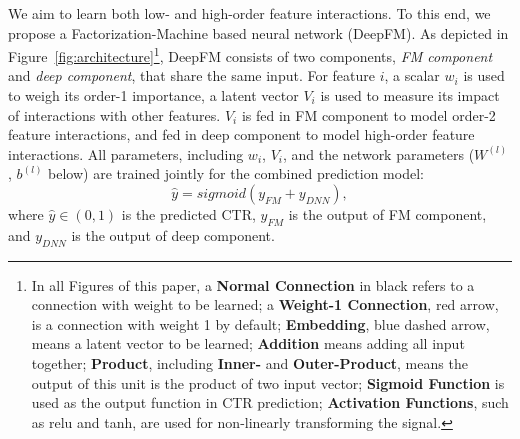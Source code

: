 We aim to learn both low- and high-order feature interactions. To this end, we propose a Factorization-Machine based neural network (DeepFM). As depicted in Figure~\ref{fig:architecture}\footnote{In all Figures of this paper, a \textbf{Normal Connection} in black refers to a connection with weight to be learned; a \textbf{Weight-1 Connection}, red arrow, is a connection with weight 1 by default; \textbf{Embedding}, blue dashed arrow, means a latent vector to be learned; \textbf{Addition} means adding all input together; \textbf{Product}, including \textbf{Inner-} and \textbf{Outer-Product}, means the output of this unit is the product of two input vector; \textbf{Sigmoid Function} is used as the output function in CTR prediction; \textbf{Activation Functions}, such as relu and tanh, are used for non-linearly transforming the signal.}, DeepFM consists of two components, \emph{FM component} and \emph{deep component}, that share  the same input. For feature $i$, a scalar $w_i$ is used to weigh its order-1 importance, a latent vector $V_i$ is used to measure its impact of interactions with other features. $V_i$ is fed in FM component to model order-2 feature interactions, and fed in deep component to model high-order feature interactions. All parameters, including $w_i$, $V_i$, and the network parameters ($W^{(l)}$, $b^{(l)}$ below) are trained jointly for the combined prediction model:
\begin{equation}
\hat{y}=sigmoid(y_{FM}+y_{DNN}),
\label{eq:FMNNCTR}
\end{equation}
where $\hat{y}\in (0,1)$ is the predicted CTR, $y_{FM}$ is the output of FM component, and $y_{DNN}$ is the output of deep component.
